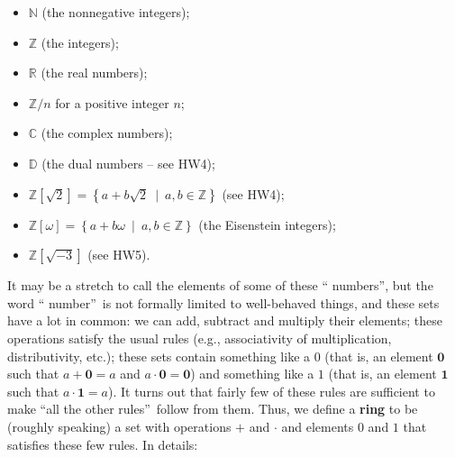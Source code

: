 \documentclass[numbers=enddot,12pt,final,onecolumn,notitlepage]{scrartcl}%
\numberwithin{exer}{subsection}
\theoremstyle{definition}
\begin{document}
\begin{itemize}
\item $\mathbb{N}$ (the nonnegative integers);

\item $\mathbb{Z}$ (the integers);

\item $\mathbb{R}$ (the real numbers);

\item $\mathbb{Z}/n$ for a positive integer $n$;

\item $\mathbb{C}$ (the complex numbers);

\item $\mathbb{D}$ (the dual numbers -- see HW4);

\item $\mathbb{Z}\left[  \sqrt{2}\right]  =\left\{  a+b\sqrt{2}\ \mid
\ a,b\in\mathbb{Z}\right\}  $ (see HW4);

\item $\mathbb{Z}\left[  \omega\right]  =\left\{  a+b\omega\ \mid
\ a,b\in\mathbb{Z}\right\}  $ (the Eisenstein integers);

\item $\mathbb{Z}\left[  \sqrt{-3}\right]  $ (see HW5).
\end{itemize}

It may be a stretch to call the elements of some of these \textquotedblleft
numbers\textquotedblright, but the word \textquotedblleft
number\textquotedblright\ is not formally limited to well-behaved things, and
these sets have a lot in common: we can add, subtract and multiply their
elements; these operations satisfy the usual rules (e.g., associativity of
multiplication, distributivity, etc.); these sets contain something like a $0$
(that is, an element $\mathbf{0}$ such that $a+\mathbf{0}=a$ and
$a\cdot\mathbf{0}=\mathbf{0}$) and something like a $1$ (that is, an element
$\mathbf{1}$ such that $a\cdot\mathbf{1}=a$). It turns out that fairly few of
these rules are sufficient to make \textquotedblleft all the other
rules\textquotedblright\ follow from them. Thus, we define a \textbf{ring} to
be (roughly speaking) a set with operations $+$ and $\cdot$ and elements $0$
and $1$ that satisfies these few rules. In details:
\end{document}
